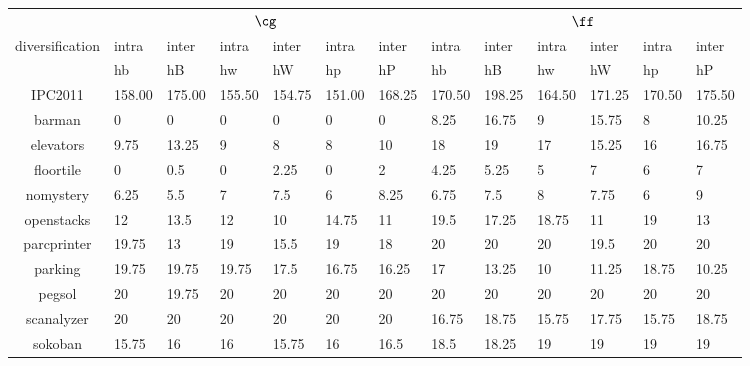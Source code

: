 

\begin{table*}[htbp]
\centering
\begin{tabularx}{\linewidth}{|c|X|X|X|X|X|X||X|X|X|X|X|X|}
 & \multicolumn{ 6}{c||}{$\cg$} & \multicolumn{ 6}{c|}{$\ff$} \\ 
diversification & intra  & inter  & intra  & inter  & intra  & inter  & intra  & inter  & intra  & inter  & intra  & inter  \\ 
                & {hb}   & {hB}   & {hw}   & {hW}   & {hp}   & {hP}   & {hb}   & {hB}   & {hw}   & {hW}   & {hp}   & {hP}   \\[0.3em]
IPC2011         & 158.00 & 175.00 & 155.50 & 154.75 & 151.00 & 168.25 & 170.50 & 198.25 & 164.50 & 171.25 & 170.50 & 175.50 \\[0.3em]
barman          & 0      & 0      & 0      & 0      & 0      & 0      & 8.25   & 16.75  & 9      & 15.75  & 8      & 10.25  \\ 
elevators       & 9.75   & 13.25  & 9      & 8      & 8      & 10     & 18     & 19     & 17     & 15.25  & 16     & 16.75  \\ 
floortile       & 0      & 0.5    & 0      & 2.25   & 0      & 2      & 4.25   & 5.25   & 5      & 7      & 6      & 7      \\ 
nomystery       & 6.25   & 5.5    & 7      & 7.5    & 6      & 8.25   & 6.75   & 7.5    & 8      & 7.75   & 6      & 9      \\ 
openstacks      & 12     & 13.5   & 12     & 10     & 14.75  & 11     & 19.5   & 17.25  & 18.75  & 11     & 19     & 13     \\ 
parcprinter     & 19.75  & 13     & 19     & 15.5   & 19     & 18     & 20     & 20     & 20     & 19.5   & 20     & 20     \\ 
parking         & 19.75  & 19.75  & 19.75  & 17.5   & 16.75  & 16.25  & 17     & 13.25  & 10     & 11.25  & 18.75  & 10.25  \\ 
pegsol          & 20     & 19.75  & 20     & 20     & 20     & 20     & 20     & 20     & 20     & 20     & 20     & 20     \\ 
scanalyzer      & 20     & 20     & 20     & 20     & 20     & 20     & 16.75  & 18.75  & 15.75  & 17.75  & 15.75  & 18.75  \\ 
sokoban         & 15.75  & 16     & 16     & 15.75  & 16     & 16.5   & 18.5   & 18.25  & 19     & 19     & 19     & 19     \\ 

\end{tabularx}
\end{table*}
